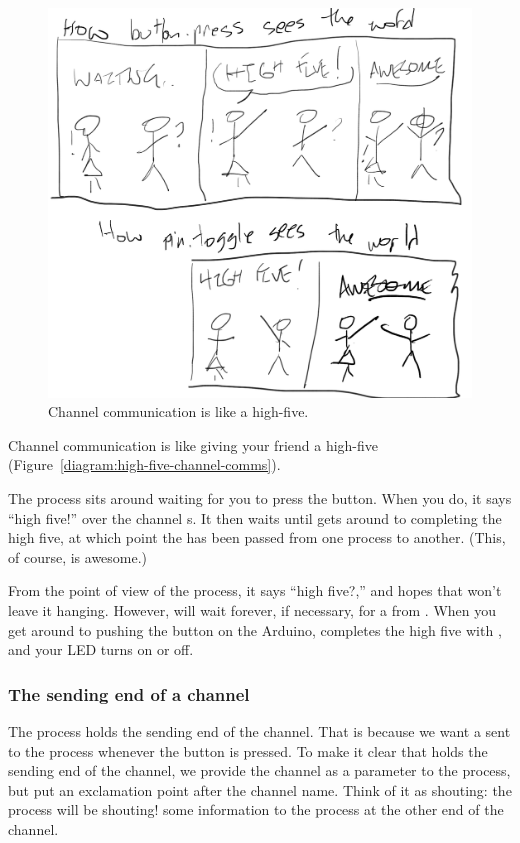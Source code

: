 \begin{figure}[h]
  \begin{center}
    \includegraphics[width=0.8\linewidth]{images/ch4-high-five-channel-comms}
    \caption{Channel communication is like a high-five.}
    \label{diagram:ch4-high-five-channel-comms}
  \end{center}
\end{figure}

Channel communication is like giving your friend a high-five (Figure~\vref{diagram:high-five-channel-comms}).


The process \bp sits around waiting for you to press the button. When you do, it says ``high five!'' over the channel {\code s}. It then waits until \tp gets around to completing the high five, at which point the \SIGNALV has been passed from one process to another. (This, of course, is awesome.)

From the point of view of the \tp process, it says ``high five?,'' and hopes that \bp won't leave it hanging. However, \tp will wait forever, if necessary, for a \SIGNALV from \bp. When you get around to pushing the button on the Arduino, \bp completes the high five with \tp, and your LED turns on or off.


\subsubsection{The sending end of a channel}
The \bp process holds the sending end of the channel. That is because we want a \SIGNALV sent to the \tp process whenever the button is pressed. To make it clear that \bp holds the sending end of the channel, we provide the channel as a parameter to the process, but put an exclamation point after the channel name. Think of it as shouting: the \bp process will be shouting! some information to the process at the other end of the channel.

